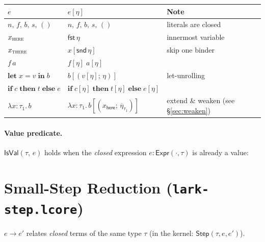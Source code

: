 \documentclass[10pt,a4paper]{article}
\newcommand{\TInt}{\mathsf{Int}}
\newcommand{\TFlt}{\mathsf{Float}}
\newcommand{\TBool}{\mathsf{Bool}}
\newcommand{\TStr}{\mathsf{Str}}
\newcommand{\TUnit}{\mathsf{Unit}}
\newcommand{\IsVal}[2]{\mathsf{IsVal}(#1,\,#2)} %
\newcommand{\step}{\to}
\newcommand{\subst}[2]{#1[#2]}
\newcommand{\klet}{\mathbf{let}}
\newcommand{\kin}{\mathbf{in}}
\newcommand{\kif}{\mathbf{if}}
\newcommand{\kthen}{\mathbf{then}}
\newcommand{\kelse}{\mathbf{else}}
\newcommand{\lfile}[1]{\texttt{#1}}
\theoremstyle{plain}
\theoremstyle{definition}
\theoremstyle{remark}
\begin{document}
\begin{center}
\renewcommand{\arraystretch}{1.35}
\begin{tabular}{@{}lll@{}}
\toprule
$e$ & $\subst{e}{\eta}$ & Note \\
\midrule
$n,\,f,\,b,\,s,\,()$ & $n,\,f,\,b,\,s,\,()$ & literals are closed \\
$x_{\textsc{here}}$ & $\mathsf{fst}\,\eta$ & innermost variable \\
$x_{\textsc{there}}$ & $\subst{x}{\mathsf{snd}\,\eta}$ & skip one binder \\
$f\,a$ & $\subst{f}{\eta}\;\subst{a}{\eta}$ & \\
$\klet\;x{=}v\;\kin\;b$
  & $\subst{b}{(\subst{v}{\eta};\,\eta)}$ & let-unrolling \\
$\kif\;c\;\kthen\;t\;\kelse\;e$
  & $\kif\;\subst{c}{\eta}\;\kthen\;\subst{t}{\eta}\;\kelse\;\subst{e}{\eta}$ & \\
$\lambda x{:}\tau_1.\,b$
  & $\lambda x{:}\tau_1.\,\subst{b}{(x_\mathsf{here};\,\overline{\eta}_{\tau_1})}$
  & extend \& weaken (see \S\ref{sec:weaken}) \\
\bottomrule
\end{tabular}
\end{center}

\paragraph{Value predicate.}
$\IsVal{\tau}{e}$ holds when the \emph{closed} expression $e : \mathsf{Expr}(\cdot,\tau)$
is already a value:

\section{Small-Step Reduction (\lfile{lark-step.lcore})}
\label{sec:step}

$e \step e'$ relates \emph{closed} terms of the same type $\tau$
(in the kernel: $\mathsf{Step}(\tau, e, e')$).
\end{document}

